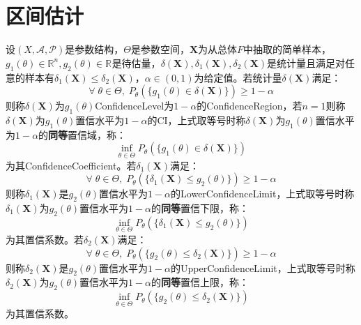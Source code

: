 \section{区间估计}

\begin{definition}
	设$(X,\mathscr{A},\mathscr{P})$是参数结构，$\Theta$是参数空间，$\mathbf{X}$为从总体$F$中抽取的简单样本，$g_1(\theta)\in\mathbb{R}^{n},g_2(\theta)\in\mathbb{R}^{}$是待估量，$\delta(\mathbf{X}),\delta_1(\mathbf{X}),\delta_2(\mathbf{X})$是统计量且满足对任意的样本有$\delta_1(\mathbf{X})\leqslant\delta_2(\mathbf{X})$，$\alpha\in(0,1)$为给定值。若统计量$\delta(\mathbf{X})$满足：
	\begin{equation*}
		\forall\;\theta\in\Theta,\;P_{\theta}(\{g_1(\theta)\in \delta(\mathbf{X})\})\geqslant 1-\alpha
	\end{equation*}
	则称$\delta(\mathbf{X})$为$g_1(\theta)$\gls{ConfidenceLevel}为$1-\alpha$的\gls{ConfidenceRegion}，若$n=1$则称$\delta(\mathbf{X})$为$g_1(\theta)$置信水平为$1-\alpha$的\gls{CI}，上式取等号时称$\delta(\mathbf{X})$为$g_1(\theta)$置信水平为$1-\alpha$的\textbf{同等}置信域，称：
	\begin{equation*}
		\inf_{\theta\in\Theta}P_{\theta}(\{g_1(\theta)\in\delta(\mathbf{X})\})
	\end{equation*}
	为其\gls{ConfidenceCoefficient}。若$\delta_1(\mathbf{X})$满足：
	\begin{equation*}
		\forall\;\theta\in\Theta,\;P_{\theta}(\{\delta_1(\mathbf{X})\leqslant g_2(\theta)\})\geqslant 1-\alpha
	\end{equation*}	
	则称$\delta_1(\mathbf{X})$是$g_2(\theta)$置信水平为$1-\alpha$的\gls{LowerConfidenceLimit}，上式取等号时称$\delta_1(\mathbf{X})$为$g_2(\theta)$置信水平为$1-\alpha$的\textbf{同等}置信下限，称：
	\begin{equation*}
		\inf_{\theta\in\Theta}P_{\theta}(\{\delta_1(\mathbf{X})\leqslant g_2(\theta)\})
	\end{equation*}
	为其置信系数。若$\delta_2(\mathbf{X})$满足：
	\begin{equation*}
		\forall\;\theta\in\Theta,\;P_{\theta}(\{g_2(\theta)\leqslant\delta_2(\mathbf{X})\})\geqslant 1-\alpha
	\end{equation*}	
	则称$\delta_2(\mathbf{X})$是$g_2(\theta)$置信水平为$1-\alpha$的\gls{UpperConfidenceLimit}，上式取等号时称$\delta_2(\mathbf{X})$为$g_2(\theta)$置信水平为$1-\alpha$的\textbf{同等}置信上限，称：
	\begin{equation*}
		\inf_{\theta\in\Theta}P_{\theta}(\{g_2(\theta)\leqslant\delta_2(\mathbf{X})\})
	\end{equation*}
	为其置信系数。
\end{definition}
